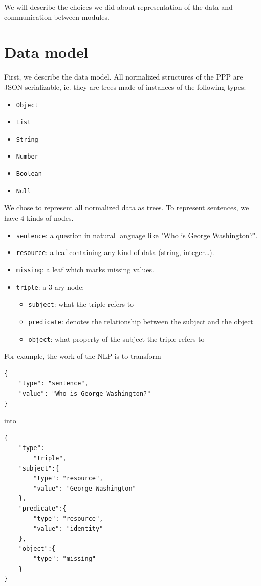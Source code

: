 We will describe the choices we did about representation of the data and communication between modules.

\section{Data model}

First, we describe the data model. All normalized structures of the PPP are JSON-serializable, ie. they are trees made of instances of the following types:
\begin{itemize}
    \item \texttt{Object}
    \item \texttt{List}
    \item \texttt{String}
    \item \texttt{Number}
    \item \texttt{Boolean}
    \item \texttt{Null}
\end{itemize}

We chose to represent all normalized data as trees. To represent sentences, we have 4 kinds of nodes.

\begin{itemize}
    \item \texttt{sentence}: a question in natural language like "Who is George Washington?".
    \item \texttt{resource}: a leaf containing any kind of data (string, integer\ldots).
    \item \texttt{missing}: a leaf which marks missing values.
    \item \texttt{triple}: a 3-ary node:
        \begin{itemize}
            \item \texttt{subject}: what the triple refers to
            \item \texttt{predicate}: denotes the relationship between the subject and the
  object
            \item \texttt{object}: what property of the subject the triple refers to
        \end{itemize}         
\end{itemize}

For example, the work of the NLP is to transform 
\begin{verbatim}
{
    "type": "sentence", 
    "value": "Who is George Washington?"
}
\end{verbatim}
into 
\begin{verbatim}
{
    "type":
        "triple",
    "subject":{
        "type": "resource",
        "value": "George Washington"
    },
    "predicate":{
        "type": "resource",
        "value": "identity"
    },
    "object":{
        "type": "missing"
    }
}
\end{verbatim}

